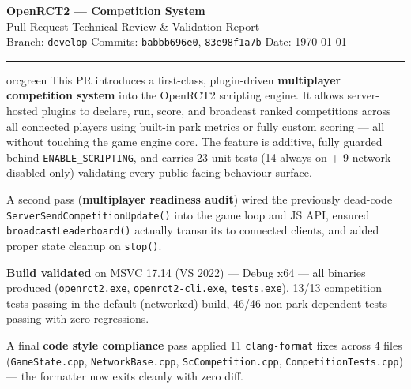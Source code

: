 \documentclass[12pt,a4paper]{article}
\begin{document}
\begin{center}
  {\LARGE\bfseries\color{orcheader} OpenRCT2 --- Competition System}\\[0.4em]
  {\large\color{orcgray} Pull Request Technical Review \& Validation Report}\\[0.2em]
  {\small\color{orcgray}
    Branch: \texttt{develop} \quad
    Commits: \texttt{babbb696e0}, \texttt{83e98f1a7b} \quad
    Date: \today
  }\\[0.6em]
  \textcolor{orcgray}{\rule{\linewidth}{1pt}}
\end{center}

\vspace{0.5em}

\begin{calloutbox}[title=Executive Summary]{orcgreen}
This PR introduces a first-class, plugin-driven \textbf{multiplayer competition system} into the OpenRCT2
scripting engine. It allows server-hosted plugins to declare, run, score, and broadcast ranked competitions
across all connected players using built-in park metrics or fully custom scoring --- all without touching the
game engine core. The feature is additive, fully guarded behind \texttt{ENABLE\_SCRIPTING}, and carries 23
unit tests (14 always-on + 9 network-disabled-only) validating every public-facing behaviour surface.

\medskip
A second pass (\textbf{multiplayer readiness audit}) wired the previously dead-code
\texttt{ServerSendCompetitionUpdate()} into the game loop and JS API, ensured
\texttt{broadcastLeaderboard()} actually transmits to connected clients, and added proper
state cleanup on \texttt{stop()}.

\medskip
\textbf{Build validated} on MSVC 17.14 (VS 2022) --- Debug x64 --- all binaries produced
(\texttt{openrct2.exe}, \texttt{openrct2-cli.exe}, \texttt{tests.exe}), 13/13 competition tests
passing in the default (networked) build, 46/46 non-park-dependent tests passing with zero regressions.

\medskip
A final \textbf{code style compliance} pass applied 11 \texttt{clang-format} fixes across 4 files
(\texttt{GameState.cpp}, \texttt{NetworkBase.cpp}, \texttt{ScCompetition.cpp},
\texttt{CompetitionTests.cpp}) --- the formatter now exits cleanly with zero diff.
\end{calloutbox}

\vspace{1em}
\end{document}
